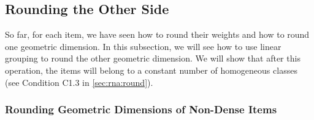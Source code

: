 \subsection{Rounding the Other Side}
\label{sec:gv-rbbp:other-side}

So far, for each item, we have seen how to round their weights
and how to round one geometric dimension.
In this subsection, we will see how to use linear grouping to
round the other geometric dimension.
We will show that after this operation, the items will belong to a constant number of
homogeneous classes (see Condition C1.3 in \cref{sec:rna:round}).

\subsubsection{Rounding Geometric Dimensions of Non-Dense Items}

